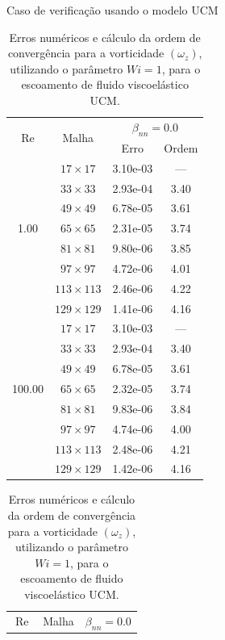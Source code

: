 \begin{frame}{Caso de verificação usando o modelo UCM}
    \centering
    \begin{table}[H]
    \caption{Erros numéricos e cálculo da ordem de convergência para a vorticidade $(\omega_{z})$, utilizando o parâmetro $Wi=1$, para o escoamento de fluido viscoelástico UCM.\label{tab_UCMWzResumida_1}}
\scriptsize{
    \begin{minipage}{0.49\textwidth}
    \begin{tabular*}{\textwidth}{@{\extracolsep\fill}cccc@{}}
    \hline
    \multirow{2}{*}{$\operatorname{Re}$} & \multirow{2}{*}{Malha} & \multicolumn{2}{c}{$\beta_{nn}=0.0$}\\ %
     & & Erro & Ordem \\
    \hline
    \multirow{7}{*}{1.00} & $17\times 17$ & 3.10e-03 & --- \\
    & $33\times 33$ & 2.93e-04 & 3.40 \\
    & $49\times 49$ & 6.78e-05 & 3.61 \\
    & $65\times 65$ & 2.31e-05 & 3.74 \\
    & $81\times 81$ & 9.80e-06 & 3.85 \\
    & $97\times 97$ & 4.72e-06 & 4.01 \\
    & $113\times 113$ & 2.46e-06 & 4.22 \\
    & $129\times 129$ & 1.41e-06 & 4.16 \\
    \hline
    \multirow{7}{*}{100.00} & $17\times 17$ & 3.10e-03 & --- \\
    & $33\times 33$ & 2.93e-04 & 3.40 \\
    & $49\times 49$ & 6.78e-05 & 3.61 \\
    & $65\times 65$ & 2.32e-05 & 3.74 \\
    & $81\times 81$ & 9.83e-06 & 3.84 \\
    & $97\times 97$ & 4.74e-06 & 4.00 \\
    & $113\times 113$ & 2.48e-06 & 4.21 \\
    & $129\times 129$ & 1.42e-06 & 4.16 \\
    \hline
    \end{tabular*}
    \end{minipage}
    \hfill
    \begin{minipage}{0.49\textwidth}
    \begin{tabular*}{\textwidth}{@{\extracolsep\fill}cccc@{}}
    \hline
    \multirow{2}{*}{$\operatorname{Re}$} & \multirow{2}{*}{Malha} & \multicolumn{2}{c}{$\beta_{nn}=0.0$}\\

\end{tabular*}
\end{minipage}}
\end{table}
\end{frame}
